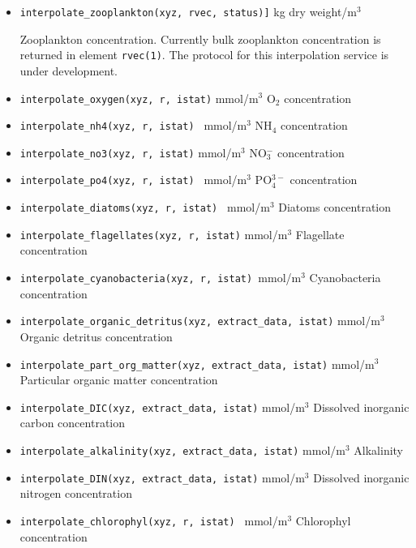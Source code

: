 \begin{itemize}    
  \item {\tt interpolate\_zooplankton(xyz, rvec, status)]} kg dry weight/m$^3$ \newline

    Zooplankton concentration. Currently bulk zooplankton concentration
    is returned in element {\tt rvec(1)}. The protocol for this interpolation service
    is under development.

  \item {\tt interpolate\_oxygen(xyz, r, istat)} mmol/m$^3$ \newline
    O$_2$ concentration

  \item {\tt interpolate\_nh4(xyz, r, istat)  } mmol/m$^3$\newline
    NH$_4$ concentration
  \item {\tt interpolate\_no3(xyz, r, istat)}   mmol/m$^3$\newline
    NO$_3^-$ concentration
  \item {\tt interpolate\_po4(xyz, r, istat) }  mmol/m$^3$\newline
    PO$_4^{3-}$ concentration
  \item {\tt interpolate\_diatoms(xyz, r, istat) } mmol/m$^3$   \newline
    Diatoms concentration
  \item {\tt interpolate\_flagellates(xyz, r, istat)} mmol/m$^3$    \newline  
    Flagellate concentration
  \item {\tt interpolate\_cyanobacteria(xyz, r, istat)  }mmol/m$^3$\newline
    Cyanobacteria concentration
  \item {\tt interpolate\_organic\_detritus(xyz, extract\_data, istat)}  mmol/m$^3$\newline
    Organic detritus concentration
  \item {\tt interpolate\_part\_org\_matter(xyz, extract\_data, istat)} mmol/m$^3$  \newline
    Particular organic matter concentration
  \item {\tt interpolate\_DIC(xyz, extract\_data, istat)}  mmol/m$^3$\newline
    Dissolved inorganic carbon concentration
  \item {\tt interpolate\_alkalinity(xyz, extract\_data, istat)}   mmol/m$^3$\newline
    Alkalinity
  \item {\tt interpolate\_DIN(xyz, extract\_data, istat)}     mmol/m$^3$\newline
    Dissolved inorganic nitrogen concentration
  \item {\tt interpolate\_chlorophyl(xyz, r, istat) } mmol/m$^3$\newline
    Chlorophyl concentration
\end{itemize}




